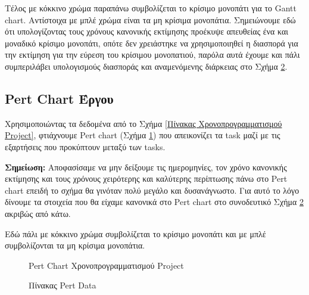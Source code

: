 \documentclass[12pt,a4paper]{article}
\begin{document}
Τέλος με κόκκινο χρώμα παραπάνω συμβολίζεται το κρίσιμο μονοπάτι για το Gantt chart. Αντίστοιχα με μπλέ χρώμα είναι τα μη κρίσιμα μονοπάτια. Σημειώνουμε εδώ ότι υπολογίζοντας τους χρόνους κανονικής εκτίμησης προέκυψε απευθείας ένα και μοναδικό κρίσιμο μονοπάτι, οπότε δεν χρειάστηκε να χρησιμοποιηθεί η διασπορά για την εκτίμηση για την εύρεση του κρίσιμου μονοπατιού, παρόλα αυτά έχουμε και πάλι συμπεριλάβει υπολογισμούς διασποράς και αναμενόμενης διάρκειας στο Σχήμα \ref{Πίνακας Pert Data}.

\subsection{Pert Chart Έργου}
\label{Ενότητα Pert Chart Έργου}

Χρησιμοποιώντας τα δεδομένα από το Σχήμα \ref{Πίνακας Χρονοπρογραμματισμού Project}, φτιάχνουμε Pert chart (Σχήμα \ref{Pert Chart Χρονοπρογραμματισμού Project}) που απεικονίζει τα task μαζί με τις εξαρτήσεις που προκύπτουν μεταξύ των tasks.

\textbf{Σημείωση:} Αποφασίσαμε να μην δείξουμε τις ημερομηνίες, τον χρόνο κανονικής εκτίμησης και τους χρόνους χειρότερης και καλύτερης περίπτωσης πάνω στο Pert chart επειδή το σχήμα θα γινόταν πολύ μεγάλο και δυσανάγνωστο. Για αυτό το λόγο δίνουμε τα στοιχεία που θα είχαμε κανονικά στο Pert chart στο συνοδευτικό Σχήμα \ref{Πίνακας Pert Data} ακριβώς από κάτω.

Εδώ πάλι με κόκκινο χρώμα συμβολίζεται το κρίσιμο μονοπάτι και με μπλέ συμβολίζονται τα μη κρίσιμα μονοπάτια.

\begin{figure}[H]
	\caption{Pert Chart Χρονοπρογραμματισμού Project}
	\label{Pert Chart Χρονοπρογραμματισμού Project}
\end{figure}

\begin{figure}[H]
	\caption{Πίνακας Pert Data}
	\label{Πίνακας Pert Data}
\end{figure}
\end{document}
